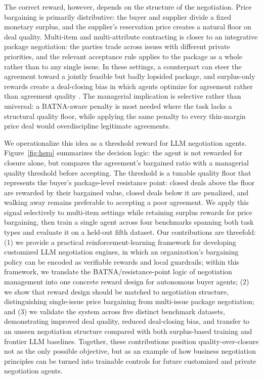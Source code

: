 \documentclass{interact}
\theoremstyle{plain}
\theoremstyle{definition}
\theoremstyle{remark}
\begin{document}
The correct reward, however, depends on the structure of the negotiation. Price bargaining is primarily distributive: the buyer and supplier divide a fixed monetary surplus, and the supplier's reservation price creates a natural floor on deal quality. Multi-item and multi-attribute contracting is closer to an integrative package negotiation: the parties trade across issues with different private priorities, and the relevant acceptance rule applies to the package as a whole rather than to any single issue. In these settings, a counterpart can steer the agreement toward a jointly feasible but badly lopsided package, and surplus-only rewards create a deal-closing bias in which agents optimize for agreement rather than agreement quality \cite{bergemann2026bilateral}. The managerial implication is selective rather than universal: a BATNA-aware penalty is most needed where the task lacks a structural quality floor, while applying the same penalty to every thin-margin price deal would overdiscipline legitimate agreements.

We operationalize this idea as a threshold reward for LLM negotiation agents. Figure~\ref{fig:hero} summarizes the decision logic: the agent is not rewarded for closure alone, but compares the agreement's bargained ratio with a managerial quality threshold before accepting. The threshold is a tunable quality floor that represents the buyer's package-level resistance point: closed deals above the floor are rewarded by their bargained value, closed deals below it are penalized, and walking away remains preferable to accepting a poor agreement. We apply this signal selectively to multi-item settings while retaining surplus rewards for price bargaining, then train a single agent across four benchmarks spanning both task types and evaluate it on a held-out fifth dataset. Our contributions are threefold: (1) we provide a practical reinforcement-learning framework for developing customized LLM negotiation engines, in which an organization's bargaining policy can be encoded as verifiable rewards and local guardrails; within this framework, we translate the BATNA/resistance-point logic of negotiation management into one concrete reward design for autonomous buyer agents; (2) we show that reward design should be matched to negotiation structure, distinguishing single-issue price bargaining from multi-issue package negotiation; and (3) we validate the system across five distinct benchmark datasets, demonstrating improved deal quality, reduced deal-closing bias, and transfer to an unseen negotiation structure compared with both surplus-based training and frontier LLM baselines. Together, these contributions position quality-over-closure not as the only possible objective, but as an example of how business negotiation principles can be turned into trainable controls for future customized and private negotiation agents.
\end{document}
